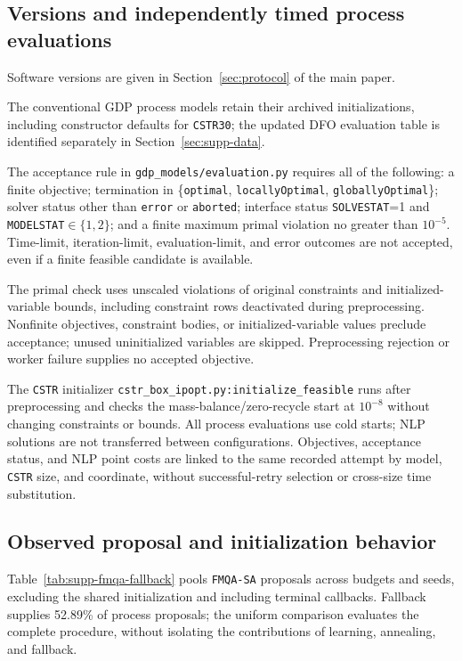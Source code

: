 \subsection{Versions and independently timed process evaluations}\label{sec:supp-acceptance}
Software versions are given in Section~\ifdefined\manuscriptwithsupplement\ref{sec:protocol}\fi{} of the main paper.

The conventional GDP process models retain their archived initializations, including constructor defaults for \texttt{CSTR30}; the updated DFO evaluation table is identified separately in Section~\ref{sec:supp-data}.

The acceptance rule in \nolinkurl{gdp_models/evaluation.py} requires all of the following: a finite objective; termination in \{\texttt{optimal}, \texttt{locallyOptimal}, \texttt{globallyOptimal}\}; solver status other than \texttt{error} or \texttt{aborted}; interface status \texttt{SOLVESTAT}=1 and \texttt{MODELSTAT}\(\in\{1,2\}\); and a finite maximum primal violation no greater than \(10^{-5}\).
Time-limit, iteration-limit, evaluation-limit, and error outcomes are not accepted, even if a finite feasible candidate is available.

The primal check uses unscaled violations of original constraints and initialized-variable bounds, including constraint rows deactivated during preprocessing.
Nonfinite objectives, constraint bodies, or initialized-variable values preclude acceptance; unused uninitialized variables are skipped.
Preprocessing rejection or worker failure supplies no accepted objective.

The \texttt{CSTR} initializer \nolinkurl{cstr_box_ipopt.py:initialize_feasible} runs after preprocessing and checks the mass-balance/zero-recycle start at \(10^{-8}\) without changing constraints or bounds.
All process evaluations use cold starts; NLP solutions are not transferred between configurations.
Objectives, acceptance status, and NLP point costs are linked to the same recorded attempt by model, \texttt{CSTR} size, and coordinate, without successful-retry selection or cross-size time substitution.



\subsection{Observed proposal and initialization behavior}\label{sec:supp-proposals}
Table~\ref{tab:supp-fmqa-fallback} pools \texttt{FMQA-SA} proposals across budgets and seeds, excluding the shared initialization and including terminal callbacks.
Fallback supplies 52.89\% of process proposals; the uniform comparison evaluates the complete procedure, without isolating the contributions of learning, annealing, and fallback.

